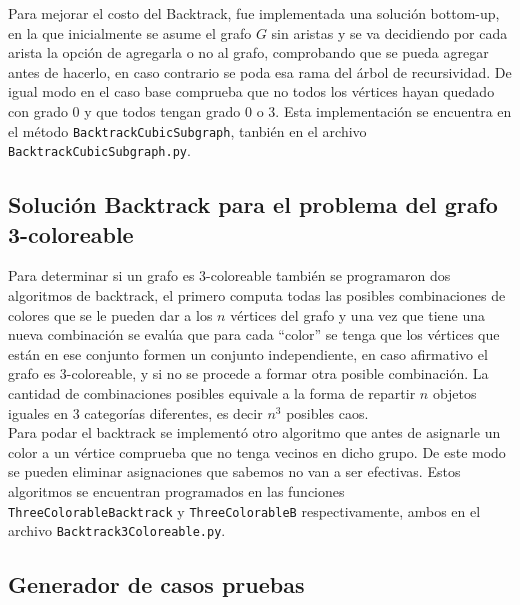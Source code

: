 \documentclass{article}
\begin{document}
Para mejorar el costo del Backtrack, fue implementada una soluci\'on bottom-up, en la que inicialmente se asume el grafo $G$ sin aristas y 
se va decidiendo por cada arista la opci\'on de agregarla o no al grafo, comprobando que se pueda agregar antes de hacerlo, en caso contrario se poda esa rama 
del \'arbol de recursividad. De igual modo en el caso base comprueba que no todos los v\'ertices hayan quedado con grado $0$ y que todos tengan grado $0$ o $3$. 
Esta implementaci\'on se encuentra en el m\'etodo \texttt{BacktrackCubicSubgraph}, tanbi\'en en el archivo \texttt{BacktrackCubicSubgraph.py}.

\subsection*{Soluci\'on Backtrack para el problema del grafo 3-coloreable}

Para determinar si un grafo es $3$-coloreable tambi\'en se programaron dos algoritmos de backtrack, el primero computa todas las posibles 
combinaciones de colores que se le pueden dar a los $n$ v\'ertices del grafo y una vez que tiene una nueva combinaci\'on se eval\'ua que para cada 
``color'' se tenga que los v\'ertices que est\'an en ese conjunto formen un conjunto independiente, en caso afirmativo el grafo es $3$-coloreable, y si no se procede a formar 
otra posible combinaci\'on. La cantidad de combinaciones posibles equivale a la forma de repartir $n$ objetos iguales en $3$ categor\'ias diferentes, es decir $n^3$ posibles caos.\\ 

Para podar el backtrack se implement\'o otro algoritmo que antes de asignarle un color a un v\'ertice comprueba que no tenga vecinos en dicho grupo. De este modo se pueden 
eliminar asignaciones que sabemos no van a ser efectivas. Estos algoritmos se encuentran programados en las funciones \texttt{ThreeColorableBacktrack} y \texttt{ThreeColorableB} respectivamente, ambos en el archivo 
\texttt{Backtrack3Coloreable.py}.

\subsection*{Generador de casos pruebas}
\end{document}
